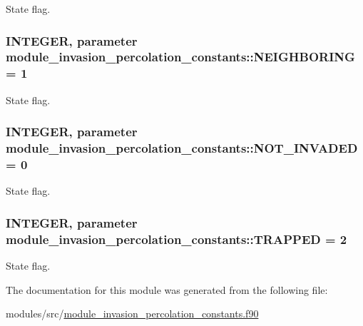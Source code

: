 \-State flag. 

\hypertarget{classmodule__invasion__percolation__constants_ab5922cbf1e44fb051d2e4f53bd488a5b}{
\subsubsection[{\-N\-E\-I\-G\-H\-B\-O\-R\-I\-N\-G}]{\setlength{\rightskip}{0pt plus 5cm}\-I\-N\-T\-E\-G\-E\-R, parameter {\bf module\-\_\-invasion\-\_\-percolation\-\_\-constants\-::\-N\-E\-I\-G\-H\-B\-O\-R\-I\-N\-G} = 1}}
\label{classmodule__invasion__percolation__constants_ab5922cbf1e44fb051d2e4f53bd488a5b}


\-State flag. 

\hypertarget{classmodule__invasion__percolation__constants_a7fecbd7b24fc856a8381da245555eb59}{
\subsubsection[{\-N\-O\-T\-\_\-\-I\-N\-V\-A\-D\-E\-D}]{\setlength{\rightskip}{0pt plus 5cm}\-I\-N\-T\-E\-G\-E\-R, parameter {\bf module\-\_\-invasion\-\_\-percolation\-\_\-constants\-::\-N\-O\-T\-\_\-\-I\-N\-V\-A\-D\-E\-D} = 0}}
\label{classmodule__invasion__percolation__constants_a7fecbd7b24fc856a8381da245555eb59}


\-State flag. 

\hypertarget{classmodule__invasion__percolation__constants_ae0a7d5e563590985dcfc6ef48fb2680c}{
\subsubsection[{\-T\-R\-A\-P\-P\-E\-D}]{\setlength{\rightskip}{0pt plus 5cm}\-I\-N\-T\-E\-G\-E\-R, parameter {\bf module\-\_\-invasion\-\_\-percolation\-\_\-constants\-::\-T\-R\-A\-P\-P\-E\-D} = 2}}
\label{classmodule__invasion__percolation__constants_ae0a7d5e563590985dcfc6ef48fb2680c}


\-State flag. 



\-The documentation for this module was generated from the following file\-:\begin{DoxyCompactItemize}
\item 
modules/src/\hyperlink{module__invasion__percolation__constants_8f90}{module\-\_\-invasion\-\_\-percolation\-\_\-constants.\-f90}\end{DoxyCompactItemize}
